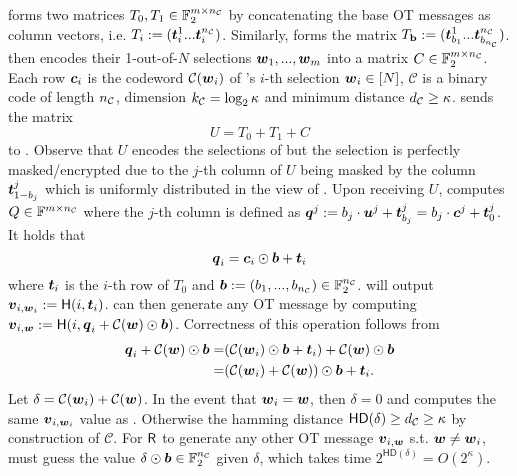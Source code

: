 \rec forms two matrices $T_0,T_1\in \mathbb{F}_2^{m\times \nc}$ by concatenating the base OT messages as column vectors, i.e. $T_i:=(\tt^1_i ... \tt^\nc_i)$. Similarly, \send forms the matrix $T_{\text{\textbf{b}}}:=(\tt^1_{b_1}...\tt^\nc_{b_\nc})$. \rec then encodes their 1-out-of-$N$ selections $\ww_1,...,\ww_m$ into a matrix $C\in \mathbb{F}_2^{m\times \nc}$. Each row $\cc_i$ is the codeword $\mathcal{C}(\ww_i)$ of \rec's $i$-th selection $\ww_i\in [N]$, $\mathcal{C}$ is a binary code of length $\nc$, dimension $\kc=\log_2\kappa$ and minimum distance $\dc\geq\kappa$. \rec sends the matrix
$$
	U=T_0+T_1+C
$$
to \send. Observe that $U$ encodes the selections of \rec but the selection is perfectly masked/encrypted due to the $j$-th column of $U$ being masked by the column $\tt^j_{1-b_j}$ which is uniformly distributed in the view of \send. Upon receiving $U$, \send computes $Q\in\mathbb{F}^{m\times\nc}$ where the $j$-th column is defined as $\qq^j:=b_j\cdot \uu^j+\tt^j_{b_j}=b_j\cdot \cc^j+\tt^j_0$. It holds that 
$$
	\qq_i=\cc_i\odot \bb + \tt_i
$$
where $\tt_i$ is the $i$-th row of $T_0$ and $\bb:=(b_1,...,b_\nc)\in \mathbb{F}^\nc_2$. \rec will output $\vv_{i,\ww_i}:=\H(i, \tt_i)$. \send can then generate any OT message by computing $\vv_{i,\ww}:=\H(i, \qq_i + \mathcal{C}(\ww)\odot \bb)$. Correctness of this operation follows from 
\begin{align*}
	\qq_i + \mathcal{C}(\ww)\odot \bb =&  (\mathcal{C}(\ww_i)\odot \bb + \tt_i) + \mathcal{C}(\ww)\odot \bb\\
	=& (\mathcal{C}(\ww_i) + \mathcal{C}(\ww)) \odot \bb +\tt_i.
\end{align*}
Let $\delta = \mathcal{C}(\ww_i) + \mathcal{C}(\ww)$. In the event that $\ww_i=\ww$, then $\delta=0$ and \send computes the same $\vv_{i,\ww_i}$ value as \rec. Otherwise the hamming distance $\textsf{HD}(\delta)\geq \dc\geq \kappa$ by construction of $\mathcal{C}$. For $\rec$ to generate any other OT message $\vv_{i,\ww}$ s.t. $\ww\neq \ww_i$, \rec must guess the value $\delta\odot \bb\in \mathbb{F}^\nc_2$ given $\delta$, which takes time $2^{\textsf{HD}(\delta)}=O(2^\kappa)$.

